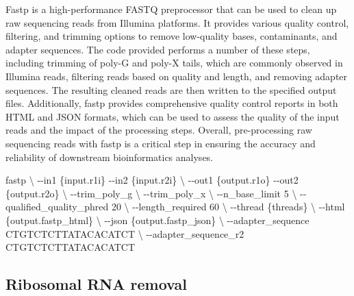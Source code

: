 \documentclass[
]{book}
\newenvironment{Shaded}{\begin{snugshade}}{\end{snugshade}}
\newcommand{\AttributeTok}[1]{\textcolor[rgb]{0.13,0.29,0.53}{#1}}
\newcommand{\DataTypeTok}[1]{\textcolor[rgb]{0.13,0.29,0.53}{#1}}
\newcommand{\ExtensionTok}[1]{#1}
\newcommand{\NormalTok}[1]{#1}
\begin{document}
Fastp is a high-performance FASTQ preprocessor that can be used to clean up raw sequencing reads from Illumina platforms. It provides various quality control, filtering, and trimming options to remove low-quality bases, contaminants, and adapter sequences. The code provided performs a number of these steps, including trimming of poly-G and poly-X tails, which are commonly observed in Illumina reads, filtering reads based on quality and length, and removing adapter sequences. The resulting cleaned reads are then written to the specified output files. Additionally, fastp provides comprehensive quality control reports in both HTML and JSON formats, which can be used to assess the quality of the input reads and the impact of the processing steps. Overall, pre-processing raw sequencing reads with fastp is a critical step in ensuring the accuracy and reliability of downstream bioinformatics analyses.

\small

\begin{Shaded}
\begin{Highlighting}[]
\ExtensionTok{fastp} \DataTypeTok{\textbackslash{}}
      \AttributeTok{{-}{-}in1}\NormalTok{ \{input.r1i\} }\AttributeTok{{-}{-}in2}\NormalTok{ \{input.r2i\} }\DataTypeTok{\textbackslash{}}
      \AttributeTok{{-}{-}out1}\NormalTok{ \{output.r1o\} }\AttributeTok{{-}{-}out2}\NormalTok{ \{output.r2o\} }\DataTypeTok{\textbackslash{}}
      \AttributeTok{{-}{-}trim\_poly\_g} \DataTypeTok{\textbackslash{}}
      \AttributeTok{{-}{-}trim\_poly\_x} \DataTypeTok{\textbackslash{}}
      \AttributeTok{{-}{-}n\_base\_limit}\NormalTok{ 5 }\DataTypeTok{\textbackslash{}}
      \AttributeTok{{-}{-}qualified\_quality\_phred}\NormalTok{ 20 }\DataTypeTok{\textbackslash{}}
      \AttributeTok{{-}{-}length\_required}\NormalTok{ 60 }\DataTypeTok{\textbackslash{}}
      \AttributeTok{{-}{-}thread}\NormalTok{ \{threads\} }\DataTypeTok{\textbackslash{}}
      \AttributeTok{{-}{-}html}\NormalTok{ \{output.fastp\_html\} }\DataTypeTok{\textbackslash{}}
      \AttributeTok{{-}{-}json}\NormalTok{ \{output.fastp\_json\} }\DataTypeTok{\textbackslash{}}
      \AttributeTok{{-}{-}adapter\_sequence}\NormalTok{ CTGTCTCTTATACACATCT }\DataTypeTok{\textbackslash{}}
      \AttributeTok{{-}{-}adapter\_sequence\_r2}\NormalTok{ CTGTCTCTTATACACATCT}
\end{Highlighting}
\end{Shaded}

\normalsize

\hypertarget{ribosomal-rna-removal-1}{%
\subsection*{Ribosomal RNA removal}\label{ribosomal-rna-removal-1}}
\end{document}
